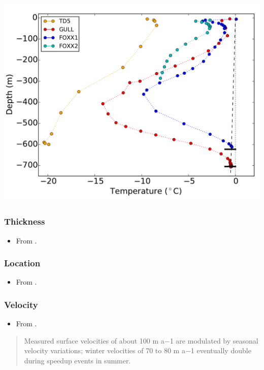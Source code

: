 \documentclass[article,a4paper,times,11pt,twoside]{article}
\begin{document}
\begin{center}
\includegraphics[width=.9\linewidth]{foxx2/luthi_2015_fig2_all.png}
\end{center}


\subsubsection{Thickness}
\label{sec:org90c3f3a}

\begin{itemize}
\item From \textcite{ryser_2014_caterpillar}.
\end{itemize}

\subsubsection{Location}
\label{sec:orgc085149}

\begin{itemize}
\item From \textcite{ryser_2014_caterpillar}.
\end{itemize}

\subsubsection{Velocity}
\label{sec:org26d254d}

\begin{itemize}
\item From \textcite{ryser_2014_caterpillar}.
\end{itemize}

\begin{quote}
Measured surface velocities of about 100 m a−1 are
modulated by seasonal velocity variations; winter
velocities of 70 to 80 m a−1 eventually double during
speedup events in summer. 
\end{quote}
\clearpage
\end{document}
